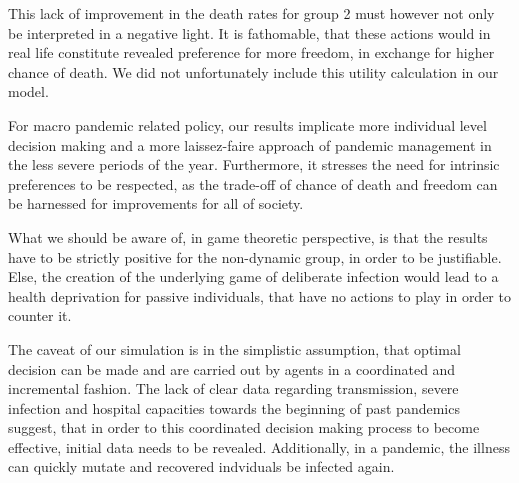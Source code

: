 \documentclass[]{article}
\begin{document}
This lack of improvement in the death rates for group 2 must however not only be interpreted in a negative light. It is fathomable, that these actions would in real life constitute revealed preference for more freedom, in exchange for higher chance of death. We did not unfortunately include this utility calculation in our model. 

For macro pandemic related policy, our results implicate more individual level decision making and a more laissez-faire approach of pandemic management in the less severe periods of the year. Furthermore, it stresses the need for intrinsic preferences to be respected, as the trade-off of chance of death and freedom can be harnessed for improvements for all of society. 

What we should be aware of, in game theoretic perspective, is that the results have to be strictly positive for the non-dynamic group, in order to be justifiable. Else, the creation of the underlying game of deliberate infection would lead to a health deprivation for passive individuals, that have no actions to play in order to counter it. 

The caveat of our simulation is in the simplistic assumption, that optimal decision can be made and are carried out by agents in a coordinated and incremental fashion. The lack of clear data regarding transmission, severe infection and hospital capacities towards the beginning of past pandemics suggest, that in order to this coordinated decision making process to become effective, initial data needs to be revealed. Additionally, in a pandemic, the illness can quickly mutate and recovered indviduals be infected again. 

\newpage
\printbibliography
\end{document}
